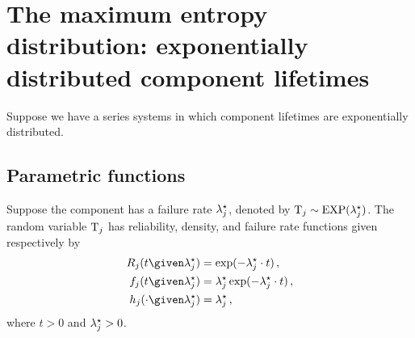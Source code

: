 \documentclass[../main.tex]{subfiles}
\begin{document}
\chapter{The maximum entropy distribution: exponentially distributed component lifetimes}
\label{sec:common_distributions}
Suppose we have a series systems in which component lifetimes are exponentially 
distributed.

\section{Parametric functions}
Suppose the \jth component has a failure rate ${\lambda}^{\star}_j$, denoted by 
$\mathrm{T}_j \sim \text{EXP}({\lambda}^{\star}_j)$. The random variable $\mathrm{T}_j$ has 
reliability, density, and failure rate functions given respectively by
\begin{align}
    \label{eq:expo_reliability}
    \srv_j(t \given \tparam\lambda_j) &=
        \exp(-\tparam\lambda_j \cdot t)\,,\\
    \label{eq:expo_pdf}
    \pdf_j(t \given \tparam\lambda_j) &=
        \tparam\lambda_j \exp(-\tparam\lambda_j \cdot t)\,,\\
    \label{eq:expo_haz}
    \haz_j(\cdot \given \tparam\lambda_j) &=
        \tparam{\lambda}_j\,,
\end{align}
where $t > 0$ and ${\lambda}^{\star}_j > 0$.
\end{document}
